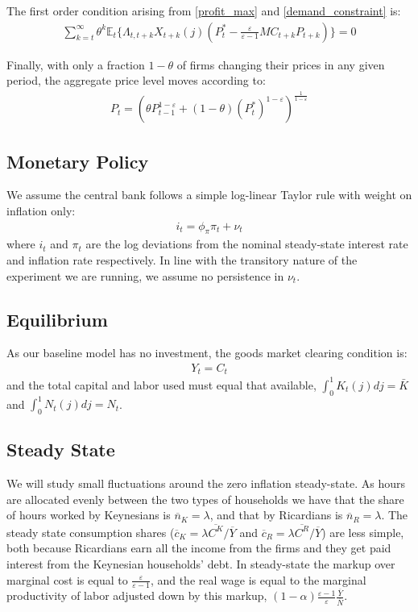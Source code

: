 \documentclass[titlepage]{\econtex}\newcommand{\texname}{ConsumptionHeterogeneity}
\begin{document}
The first order condition arising from \ref{profit_max}  and \ref{demand_constraint} is:
\begin{align}
\sum_{k=t}^{\infty} \theta^k \mathbb{E}_t \Big\{{\Lambda}_{t,t+k} X_{t+k}(j) \left(P_t^* - \frac{\varepsilon}{\varepsilon-1}MC_{t+k} P_{t+k}\right)  \Big\} = 0 \label{foc_pricing}
\end{align}

Finally, with only a fraction $1-\theta$ of firms changing their prices in any given period, the aggregate price level moves according to:
\begin{align*}
P_t = \left(   \theta P_{t-1}^{1-\varepsilon} + (1-\theta)(P_t^*)^{1-\varepsilon}\right)^{\frac{1}{1-\varepsilon}}
\end{align*}

\subsection{Monetary Policy}
We assume the central bank follows a simple log-linear Taylor rule with weight on inflation only:
\begin{align}
i_t = \phi_{\pi} \pi_t + \nu_t	\label{taylor_rule}
\end{align}
where $i_t$ and $\pi_t$ are the log deviations from the nominal steady-state interest rate and inflation rate respectively. In line with the transitory nature of the experiment we are running, we assume no persistence in $\nu_t$.

\subsection{Equilibrium}
As our baseline model has no investment, the goods market clearing condition is:
\begin{align}
Y_t = C_t	\label{agg_prod}
\end{align}
and the total capital and labor used must equal that available, $\int_0^1 K_t(j)dj = \bar{K}$ and $\int_0^1 N_t(j)dj = N_t$.

\subsection{Steady State}
We will study small fluctuations around the zero inflation steady-state. As hours are allocated evenly between the two types of households we have that the share of hours worked by Keynesians is $\overline{n}_{K} = \lambda$, and that by Ricardians is $\overline{n}_{R} = \lambda$. The steady state consumption shares ($\overline{c}_{K} = \lambda\overline{C^K}/\overline{Y}$ and $\overline{c}_{R} = \lambda\overline{C^R}/\overline{Y}$) are less simple, both because Ricardians earn all the income from the firms and they get paid interest from the Keynesian households' debt. In steady-state the markup over marginal cost is equal to $\frac{\varepsilon}{\varepsilon-1}$, and the real wage is equal to the marginal productivity of labor adjusted down by this markup, $(1-\alpha) \frac{\varepsilon-1}{\varepsilon}\frac{\overline{Y}}{\overline{N}}$. 
\end{document}
